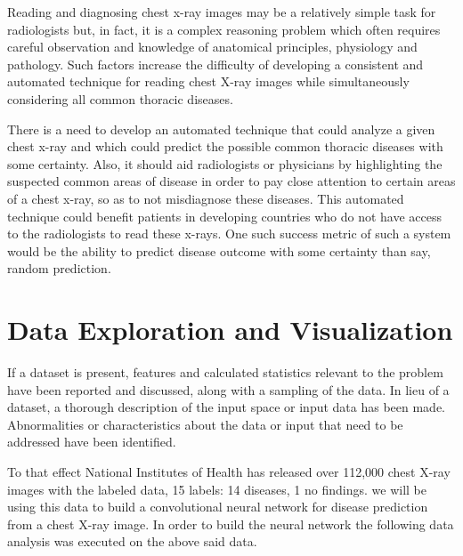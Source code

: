 \documentclass{article}
\begin{document}
    Reading and diagnosing chest x-ray images may be a relatively simple task for radiologists but, in fact, it is a complex reasoning problem which often requires careful observation and knowledge of anatomical principles, physiology and pathology. Such factors increase the difficulty of developing a consistent and automated technique for reading chest X-ray images while simultaneously considering all common thoracic diseases.\cite{nih-gov-xray-release}

    There is a need to develop an automated technique that could analyze a given chest x-ray and which could predict the possible common thoracic diseases with some certainty. Also, it should aid radiologists or physicians by highlighting the suspected common areas of disease in order to pay close attention to certain areas of a chest x-ray, so as to not misdiagnose these diseases. This automated technique could benefit patients in developing countries who do not have access to the radiologists to read these x-rays.
    One such success metric of such a system would be the ability to predict disease outcome with some certainty than say, random prediction.

    \section{Data Exploration and Visualization}
    If a dataset is present, features and calculated statistics relevant to the problem have been reported and discussed, along with a sampling of the data. In lieu of a dataset, a thorough description of the input space or input data has been made. Abnormalities or characteristics about the data or input that need to be addressed have been identified.
    
    To that effect National Institutes of Health has released over 112,000 chest X-ray images with the labeled data, 15 labels: 14 diseases, 1 no findings.\cite{nih-gov-xray-release} we will be using this data to build a convolutional neural network for disease prediction from a chest X-ray image. In order to build the neural network the following data analysis was executed on the above said data.
\end{document}
